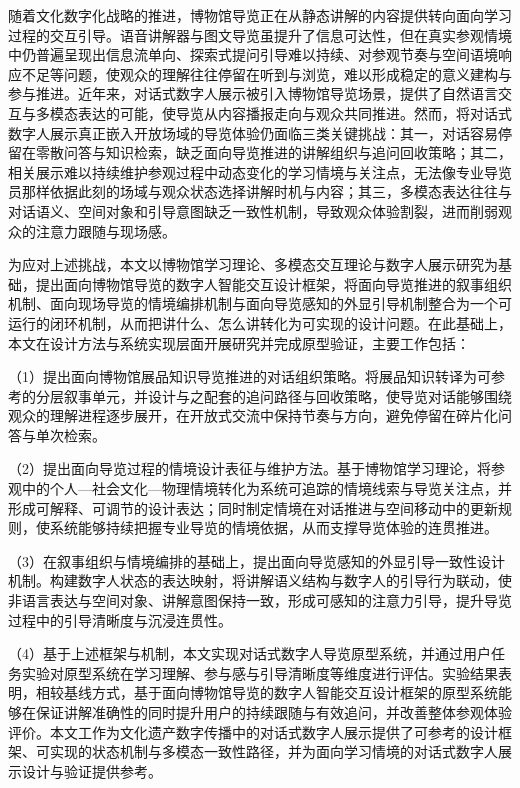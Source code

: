 
\begin{cabstract}
随着文化数字化战略的推进，博物馆导览正在从静态讲解的内容提供转向面向学习过程的交互引导。语音讲解器与图文导览虽提升了信息可达性，但在真实参观情境中仍普遍呈现出信息流单向、探索式提问引导难以持续、对参观节奏与空间语境响应不足等问题，使观众的理解往往停留在听到与浏览，难以形成稳定的意义建构与参与推进。近年来，对话式数字人展示被引入博物馆导览场景，提供了自然语言交互与多模态表达的可能，使导览从内容播报走向与观众共同推进。然而，将对话式数字人展示真正嵌入开放场域的导览体验仍面临三类关键挑战：其一，对话容易停留在零散问答与知识检索，缺乏面向导览推进的讲解组织与追问回收策略；其二，相关展示难以持续维护参观过程中动态变化的学习情境与关注点，无法像专业导览员那样依据此刻的场域与观众状态选择讲解时机与内容；其三，多模态表达往往与对话语义、空间对象和引导意图缺乏一致性机制，导致观众体验割裂，进而削弱观众的注意力跟随与现场感。

为应对上述挑战，本文以博物馆学习理论、多模态交互理论与数字人展示研究为基础，提出面向博物馆导览的数字人智能交互设计框架，将面向导览推进的叙事组织机制、面向现场导览的情境编排机制与面向导览感知的外显引导机制整合为一个可运行的闭环机制，从而把讲什么、怎么讲转化为可实现的设计问题。在此基础上，本文在设计方法与系统实现层面开展研究并完成原型验证，主要工作包括：

（1）提出面向博物馆展品知识导览推进的对话组织策略。将展品知识转译为可参考的分层叙事单元，并设计与之配套的追问路径与回收策略，使导览对话能够围绕观众的理解进程逐步展开，在开放式交流中保持节奏与方向，避免停留在碎片化问答与单次检索。

（2）提出面向导览过程的情境设计表征与维护方法。基于博物馆学习理论，将参观中的个人—社会文化—物理情境转化为系统可追踪的情境线索与导览关注点，并形成可解释、可调节的设计表达；同时制定情境在对话推进与空间移动中的更新规则，使系统能够持续把握专业导览的情境依据，从而支撑导览体验的连贯推进。

（3）在叙事组织与情境编排的基础上，提出面向导览感知的外显引导一致性设计机制。构建数字人状态的表达映射，将讲解语义结构与数字人的引导行为联动，使非语言表达与空间对象、讲解意图保持一致，形成可感知的注意力引导，提升导览过程中的引导清晰度与沉浸连贯性。

（4）基于上述框架与机制，本文实现对话式数字人导览原型系统，并通过用户任务实验对原型系统在学习理解、参与感与引导清晰度等维度进行评估。实验结果表明，相较基线方式，基于面向博物馆导览的数字人智能交互设计框架的原型系统能够在保证讲解准确性的同时提升用户的持续跟随与有效追问，并改善整体参观体验评价。本文工作为文化遗产数字传播中的对话式数字人展示提供了可参考的设计框架、可实现的状态机制与多模态一致性路径，并为面向学习情境的对话式数字人展示设计与验证提供参考。
\end{cabstract}

